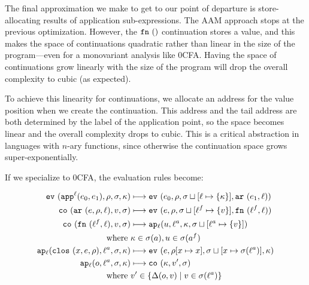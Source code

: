 \documentclass[preprint,onecolumn,9pt]{sigplanconf} %
\begin{document}
The final approximation we make to get to our point of departure is
store-allocating results of application sub-expressions. 
The AAM approach stops at the previous optimization. 
However, the ${\tt fn{\ }}({})$ continuation stores a value, and this makes the space of
continuations quadratic rather than linear in the size of the program---even for a monovariant analysis like 0CFA.
Having the space of continuations grow linearly with the size of the program 
will drop the overall complexity to cubic (as expected).

To achieve this linearity for continuations, we allocate an address
for the value position when we create the continuation.  This address
and the tail address are both determined by the label of the
application point, so the space becomes linear and the overall
complexity drops to cubic.  This is a critical abstraction in
languages with $n$-ary functions, since otherwise the continuation
space grows super-exponentially.

If we specialize to 0CFA, the evaluation rules become:


\newcommand{\ext}[3]{#1\sqcup[#2\mapsto#3]}

\begin{align*}
\ev{\sapp[^\mlab]{\mexpi0}{\mexpi1},\menv,\msto,\mkont} &\machstep
\ev{\mexpi{0},\menv,\ext{\msto}{\mlab}{\{\mkont\}},\kar{\mexpi{1},\mlab}}
\\
\co{\kar{\mexp,\menv,\mlab},\mval,\msto} & \machstep
\ev{\mexp,\menv,\ext{\msto}{\mlab^f}{\{\mval\}},\kfn{\mlab^f,\mlab}}
\\
\co{\kfn{\mlab^f,\mlab},\mval,\msto} & \machstep
\ap[_\mlab]{\mvalx{u},\mlab^a,\mkont,\ext{\msto}{\mlab^a}{\{\mval\}}}
\\
\text{ where } &\mkont \in \msto(\maddr), \mvalx{u} \in \msto(\maddr^f)
\\
\ap[_\mlab]{\clos{\mvar,\mexp,\menv},\mlab^a, \msto,\mkont} & \machstep
\ev{\mexp,\menv[\mvar\mapsto\mvar],\ext{\msto}{\mvar}{\msto(\mlab^a)},\mkont}
\\
\ap[_\mlab]{\mop,\mlab^a,\msto,\mkont} & \machstep
\co{\mkont,\mval',\msto}
\\
\text{ where }& \mval'\in \{\interpdelta(\mop,\mval) \mid \mval \in \msto(\mlab^a)\}
\end{align*}
\end{document}
